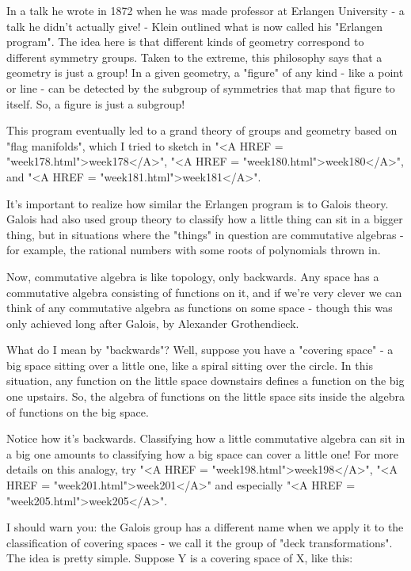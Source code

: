 In a talk he wrote in 1872 when he was made professor at Erlangen 
University - a talk he didn't actually give! - Klein outlined what is now 
called his "Erlangen program".  The idea here is that different 
kinds of 
geometry correspond to different symmetry groups.  Taken to the extreme,
this philosophy says that a geometry is just a group!  In a given geometry, 
a "figure" of any kind - like a point or line - can be detected 
by the 
subgroup of symmetries that map that figure to itself.  So, a figure is 
just a subgroup!  

This program eventually led to a grand theory of groups and geometry based 
on "flag manifolds", which I tried to sketch in "<A HREF = "week178.html">week178</A>", "<A HREF = "week180.html">week180</A>", and 
"<A HREF = "week181.html">week181</A>".  

It's important to realize how similar the Erlangen program is to Galois 
theory.  Galois had also used group theory to classify how a little thing 
can sit in a bigger thing, but in situations where the "things" in question 
are commutative algebras - for example, the rational numbers with some roots 
of polynomials thrown in.

Now, commutative algebra is like topology, only backwards.  Any space has 
a commutative algebra consisting of functions on it, and if we're very 
clever we can think of any commutative algebra as functions on some space - 
though this was only achieved long after Galois, by Alexander Grothendieck. 

What do I mean by "backwards"?  Well, suppose you 
have a "covering
space" - a big space sitting over a little one, like a spiral sitting 
over the circle.  In this situation, any function on the little space 
downstairs defines a function on the big one upstairs.  So, the algebra 
of functions on the little space sits inside the algebra of functions on 
the big space.  

Notice how it's backwards.  Classifying how a little commutative
algebra can sit in a big one amounts to classifying how a big space 
can cover a little one!  For more details on this analogy, 
try "<A HREF = "week198.html">week198</A>", 
"<A HREF = "week201.html">week201</A>" and
especially "<A HREF = "week205.html">week205</A>". 
 
I should warn you: the Galois group has a different name when we apply 
it to the classification of covering spaces - we call it the group 
of "deck transformations".  The idea is pretty simple.  Suppose Y is a 
covering space of X, like this:



